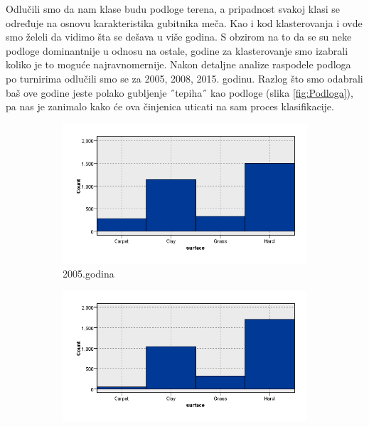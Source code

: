 \documentclass[a4paper]{article}
\begin{document}
Odlučili smo da nam klase budu podloge terena, a pripadnost svakoj klasi se određuje na osnovu karakteristika gubitnika meča.  {\color{red}{Možda i ovde da probamo da grupišemo prvo po podlogama, pa pripadnost da gađamo na osnovu proseka?}} Kao i kod klasterovanja i ovde smo želeli da vidimo šta se dešava u više godina. S obzirom na to da se su neke podloge dominantnije u odnosu na ostale, godine za klasterovanje smo izabrali koliko je to moguće najravnomernije. Nakon detaljne analize raspodele podloga po turnirima odlučili smo se za 2005, 2008, 2015. godinu. Razlog što smo odabrali baš ove godine jeste polako gubljenje ˝tepiha˝ kao podloge (slika \ref{fig:Podloga}), pa nas je zanimalo kako će ova činjenica uticati na sam proces klasifikacije. 

\begin{figure}[H]
	\begin{subfigure}[h]{0.37\textwidth}
		\begin{center}
			\includegraphics[scale=0.40]{Klasifikacija/HistogramiPodlogaTerena/Graphboard2005.png}
		\end{center}
		\caption{2005.godina}
		\label{fig:Podloga2005}
	\end{subfigure}
	\hfill
	\begin{subfigure}[h]{0.37\textwidth}
		\begin{center}
			\includegraphics[scale=0.40]{Klasifikacija/HistogramiPodlogaTerena/Graphboard2008.png}

\end{center}
\end{subfigure}
\end{figure}
\end{document}
